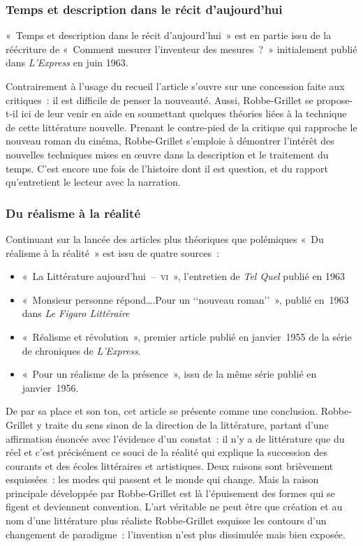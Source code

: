 \subsubsection{Temps et description dans le récit d'aujourd'hui}
«~Temps et description dans le récit d'aujourd'hui~» est en partie issu de la réécriture de «~Comment mesurer l'inventeur des mesures~?~» initialement publié dans \textit{L'Express} en juin 1963.

Contrairement à l'usage du recueil l'article s'ouvre sur une concession faite aux critiques~: il est difficile de penser la nouveauté. Aussi, Robbe-Grillet se propose-t-il ici de leur venir en aide en soumettant quelques théories liées à la technique de cette littérature nouvelle. Prenant le contre-pied de la critique qui rapproche le nouveau roman du cinéma, Robbe-Grillet s'emploie à démontrer l'intérêt des nouvelles techniques mises en œuvre dans la description et le traitement du temps. C'est encore une fois de l'histoire dont il est question, et du rapport qu'entretient le lecteur avec la narration.


\subsubsection{Du réalisme à la réalité}
			Continuant sur la lancée des articles plus théoriques que polémiques «~Du réalisme à la réalité~» est issu de quatre sources~:

\begin{itemize}

	\item «~La Littérature aujourd'hui~–~\textsc{vi}~», l'entretien de \textit{Tel Quel} publié en 1963

	\item «~Monsieur personne répond….Pour un ‘‘nouveau roman’’~», publié en~1963 dans \textit{Le Figaro Littéraire}

	\item «~Réalisme et révolution~», premier article publié en janvier~1955 de la série de chroniques de \textit{L'Express}.

	\item «~Pour un réalisme de la présence~», issu de la même série publié en janvier~1956.
\end{itemize}
De par sa place et son ton, cet article se présente comme une conclusion. Robbe-Grillet y traite du sens sinon de la direction de la littérature, partant d'une affirmation énoncée avec l'évidence d'un constat~: il n'y a de littérature que du réel et c'est précisément ce souci de la réalité qui explique la succession des courants et des écoles littéraires et artistiques. Deux raisons sont brièvement esquissées~: les modes qui passent et le monde qui change. Mais la raison principale développée par Robbe-Grillet est là l'épuisement des formes qui se figent et deviennent convention. L'art véritable ne peut être que création et au nom d'une littérature plus réaliste Robbe-Grillet esquisse les contours d'un changement de paradigme~: l'invention n'est plus dissimulée mais bien exposée.


